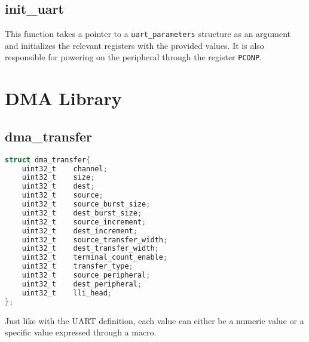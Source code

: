 \subsection{init\_uart}
This function takes a pointer to a \texttt{uart\_parameters} structure as an argument and initializes the relevant registers with the provided values. It is also responsible for powering on the peripheral through the register \texttt{PCONP}. 

\section{DMA Library}
\subsection{dma\_transfer}

\begin{lstlisting}[language= C, caption = DMA transfer struct]
struct dma_transfer{
	uint32_t	channel;
	uint32_t 	size;
	uint32_t 	dest;
	uint32_t 	source;
	uint32_t	source_burst_size;
	uint32_t	dest_burst_size;
	uint32_t 	source_increment;
	uint32_t 	dest_increment;
	uint32_t	source_transfer_width;
	uint32_t	dest_transfer_width;
	uint32_t	terminal_count_enable;
	uint32_t 	transfer_type;
	uint32_t 	source_peripheral;
	uint32_t	dest_peripheral;
	uint32_t 	lli_head;
};
\end{lstlisting} \label{dma_struct}

Just like with the UART definition, each value can either be a numeric value or a specific value expressed through a macro.

